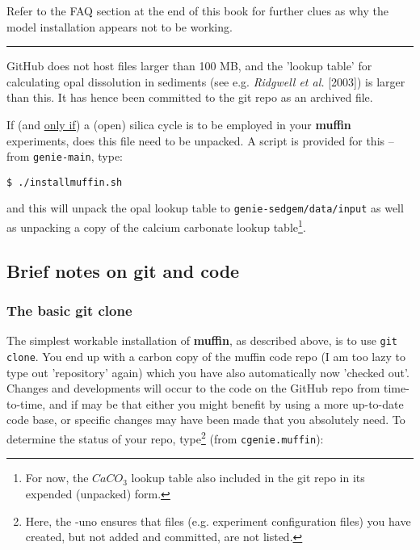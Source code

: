 \documentclass[11pt,fleqn]{book} %
\begin{document}
Refer to the FAQ section at the end of this book for further clues as why the model installation appears not to be working.

\vspace{1mm}
\noindent\rule{4cm}{0.5pt}
\vspace{2mm}

\noindent GitHub does not host files larger than 100 MB, and the 'lookup table' for calculating opal dissolution in sediments (see e.g. \textit{Ridgwell et al.} [2003]) is larger than this. It has hence been committed to the git repo as an archived file.

If (and \uline{only if}) a (open) silica cycle is to be employed in your \textbf{muffin} experiments, does this file need to be unpacked. A script is provided for this -- from \texttt{genie-main}, type:

\vspace{-2mm}
\begin{verbatim}
$ ./installmuffin.sh
\end{verbatim}
\vspace{-2mm}

\noindent and this will unpack the opal lookup table to \texttt{genie-sedgem/data/input} as well as unpacking a copy of the calcium carbonate lookup table\footnote{For now, the \(CaCO_{3}\) lookup table also included in the git repo in its expended (unpacked) form.}.


\subsection{Brief notes on git and code}

\subsubsection*{The basic git clone}

The simplest workable installation of \textbf{muffin}, as described above, is to use \texttt{git clone}. You end up with a carbon copy of the muffin code repo (I am too lazy to type out 'repository' again) which you have also automatically now 'checked out'. Changes and developments will occur to the code on the GitHub repo from time-to-time, and if may be that either you might benefit by using a more up-to-date code base, or specific changes may have been made that you absolutely need. To determine the status of your repo, type\footnote{Here, the -uno ensures that files (e.g. experiment configuration files) you have created, but not added and committed, are not listed.} (from \texttt{cgenie.muffin}):
\end{document}

